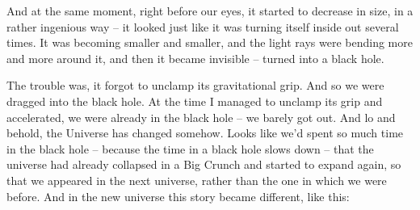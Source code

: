 \documentclass[ebook,twoside,final,openright]{memoir}
\begin{document}
\par
And at the same moment, right before our eyes, it started to decrease in size, in a rather ingenious way – it looked just like it was turning itself inside out several times. It was becoming smaller and smaller, and the light rays were bending more and more around it, and then it became invisible – turned into a black hole.\par
The trouble was, it forgot to unclamp its gravitational grip. And so we were dragged into the black hole. At the time I managed to unclamp its grip and accelerated, we were already in the black hole – we barely got out. And lo and behold, the Universe has changed somehow. Looks like we’d spent so much time in the black hole – because the time in a black hole slows down – that the universe had already collapsed in a Big Crunch and started to expand again, so that we appeared in the next universe, rather than the one in which we were before. And in the new universe this story became different, like this:
\end{document}

